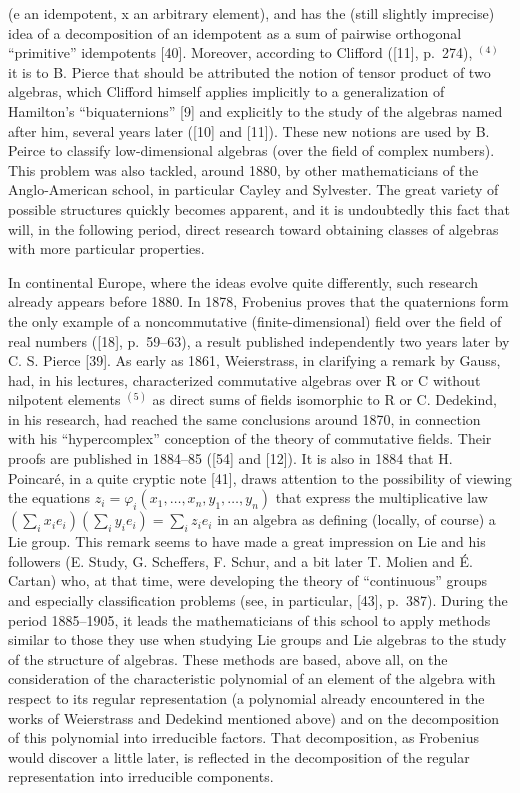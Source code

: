 (e an idempotent, x an arbitrary element), and has the (still slightly imprecise) idea of a decomposition of an idempotent as a sum of pairwise orthogonal ``primitive'' idempotents {[}40{]}. Moreover, according to Clifford ({[}11{]}, p.~274), \(^{(4)}\) it is to B. Pierce that should be attributed the notion of tensor product of two algebras, which Clifford himself applies implicitly to a generalization of Hamilton's ``biquaternions'' {[}9{]} and explicitly to the study of the algebras named after him, several years later ({[}10{]} and {[}11{]}). These new notions are used by B. Peirce to classify low-dimensional algebras (over the field of complex numbers). This problem was also tackled, around 1880, by other mathematicians of the Anglo-American school, in particular Cayley and Sylvester. The great variety of possible structures quickly becomes apparent, and it is undoubtedly this fact that will, in the following period, direct research toward obtaining classes of algebras with more particular properties.

In continental Europe, where the ideas evolve quite differently, such research already appears before 1880. In 1878, Frobenius proves that the quaternions form the only example of a noncommutative (finite-dimensional) field over the field of real numbers ({[}18{]}, p.~59--63), a result published independently two years later by C. S. Pierce {[}39{]}. As early as 1861, Weierstrass, in clarifying a remark by Gauss, had, in his lectures, characterized commutative algebras over R or C without nilpotent elements \(^{(5)}\) as direct sums of fields isomorphic to R or C. Dedekind, in his research, had reached the same conclusions around 1870, in connection with his ``hypercomplex'' conception of the theory of commutative fields. Their proofs are published in 1884--85 ({[}54{]} and {[}12{]}). It is also in 1884 that H. Poincaré, in a quite cryptic note {[}41{]}, draws attention to the possibility of viewing the equations \(z_{i} = \varphi_{i}(x_{1}, \ldots, x_{n}, y_{1}, \ldots, y_{n})\) that express the multiplicative law \((\sum_{i} x_{i} e_{i})(\sum_{i} y_{i} e_{i}) = \sum_{i} z_{i} e_{i}\) in an algebra as defining (locally, of course) a Lie group. This remark seems to have made a great impression on Lie and his followers (E. Study, G. Scheffers, F. Schur, and a bit later T. Molien and É. Cartan) who, at that time, were developing the theory of ``continuous'' groups and especially classification problems (see, in particular, {[}43{]}, p.~387). During the period 1885--1905, it leads the mathematicians of this school to apply methods similar to those they use when studying Lie groups and Lie algebras to the study of the structure of algebras. These methods are based, above all, on the consideration of the characteristic polynomial of an element of the algebra with respect to its regular representation (a polynomial already encountered in the works of Weierstrass and Dedekind mentioned above) and on the decomposition of this polynomial into irreducible factors. That decomposition, as Frobenius would discover a little later, is reflected in the decomposition of the regular representation into irreducible components.

